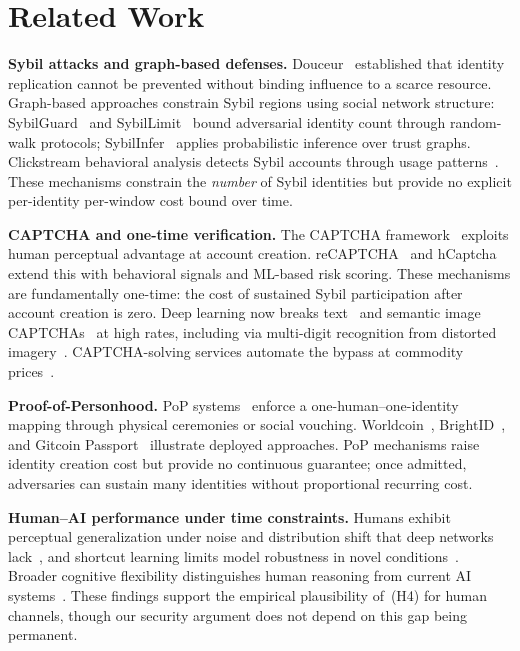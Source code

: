 \documentclass[11pt]{article}
\theoremstyle{remark}
\theoremstyle{plain}
\begin{document}
	
	\section{Related Work}
	\label{sec:related}
	
	\noindent\textbf{Sybil attacks and graph-based defenses.}
	Douceur~\cite{douceur2002sybil} established that identity replication
	cannot be prevented without binding influence to a scarce resource.
	Graph-based approaches constrain Sybil regions using social network
	structure: SybilGuard~\cite{yu2006sybilguard} and
	SybilLimit~\cite{yu2008sybillimit} bound adversarial identity count
	through random-walk protocols; SybilInfer~\cite{danezis2009sybilinfer}
	applies probabilistic inference over trust graphs. Clickstream
	behavioral analysis detects Sybil accounts through usage
	patterns~\cite{wang2013clickstream}. These mechanisms constrain the
	\emph{number} of Sybil identities but provide no explicit per-identity
	per-window cost bound over time.
	
	\noindent\textbf{CAPTCHA and one-time verification.}
	The CAPTCHA framework~\cite{vonahn2003captcha} exploits human
	perceptual advantage at account creation. reCAPTCHA~\cite{recaptcha2019}
	and hCaptcha~\cite{hcaptcha2020} extend this with behavioral signals and
	ML-based risk scoring. These mechanisms are fundamentally one-time: the
	cost of sustained Sybil participation after account creation is zero.
	Deep learning now breaks text~\cite{bursztein2011text,ye2018yet} and
	semantic image CAPTCHAs~\cite{sivakorn2016iam} at high rates, including
	via multi-digit recognition from distorted
	imagery~\cite{goodfellow2014multidigit}. CAPTCHA-solving services
	automate the bypass at commodity prices~\cite{motoyama2010recaptchas}.
	
	\noindent\textbf{Proof-of-Personhood.}
	PoP systems~\cite{borge2017proofofpersonhood,ford2020pseudonym} enforce
	a one-human--one-identity mapping through physical ceremonies or social
	vouching. Worldcoin~\cite{worldcoin2023}, BrightID~\cite{brightid2022},
	and Gitcoin Passport~\cite{gitcoin2023} illustrate deployed approaches.
	PoP mechanisms raise identity creation cost but provide no continuous
	guarantee; once admitted, adversaries can sustain many identities
	without proportional recurring cost.
	
	\noindent\textbf{Human--AI performance under time constraints.}
	Humans exhibit perceptual generalization under noise and distribution
	shift that deep networks lack~\cite{geirhos2018generalisation,geirhos2019texture},
	and shortcut learning limits model robustness in novel
	conditions~\cite{geirhos2020shortcut}. Broader cognitive flexibility
	distinguishes human reasoning from current AI
	systems~\cite{lake2017building}. These findings support the empirical
	plausibility of~(H4) for human channels, though our security argument
	does not depend on this gap being permanent.
	
\end{document}
